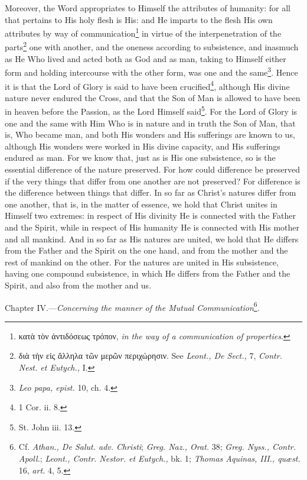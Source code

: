 Moreover, the Word appropriates to Himself the attributes of humanity: for all that pertains to His holy flesh is His: and He imparts to the flesh His own attributes by way of communication\footnote{\textgreek{κατὰ τὸν ἀντιδόσεως τρόπον}, \emph{in the way of a communication of properties}.} in virtue of the interpenetration of the parts\footnote{\textgreek{διὰ τὴν εἰς ἄλληλα τῶν μερῶν περιχώρησιν}. See \emph{Leont., De Sect., }7, \emph{Contr. Nest. et Eutych.,} I.} one with another, and the oneness according to subsistence, and inasmuch as He Who lived and acted both as God and as man, taking to Himself either form and holding intercourse with the other form, was one and the same\footnote{\emph{Leo papa, epist. }10, ch. 4.}. Hence it is that the Lord of Glory is said to have been crucified\footnote{1 Cor. ii. 8.}, although His divine nature never endured the Cross, and that the Son of Man is allowed to have been in heaven before the Passion, as the Lord Himself said\footnote{St. John iii. 13.}. For the Lord of Glory is one and the same with Him Who is in nature and in truth the Son of Man, that is, Who became man, and both His wonders and His sufferings are known to us, although His wonders were worked in His divine capacity, and His sufferings endured as man. For we know that, just as is His one subsistence, so is the essential difference of the nature preserved. For how could difference be preserved if the very things that differ from one another are not preserved? For difference is the difference between things that differ. In so far as Christ’s natures differ from one another, that is, in the matter of essence, we hold that Christ unites in Himself two extremes: in respect of His divinity He is connected with the Father and the Spirit, while in respect of His humanity He is connected with His mother and all mankind. And in so far as His natures are united, we hold that He differs from the Father and the Spirit on the one hand, and from the mother and the rest of mankind on the other. For the natures are united in His subsistence, having one compound subsistence, in which He differs from the Father and the Spirit, and also from the mother and us.


Chapter IV.—\emph{Concerning the manner of the Mutual Communication}\footnote{Cf. \emph{Athan., De Salut. adv. Christi}; \emph{Greg. Naz., Orat. }38; \emph{Greg. Nyss., Contr. Apoll.}; \emph{Leont., Contr. Nestor. et Eutych., }bk. 1; \emph{Thomas Aquinas, III., quæst. }16, \emph{art. }4, 5.}.

